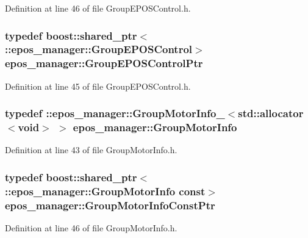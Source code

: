 \-Definition at line 46 of file \-Group\-E\-P\-O\-S\-Control.\-h.

\subsubsection[{\-Group\-E\-P\-O\-S\-Control\-Ptr}]{\setlength{\rightskip}{0pt plus 5cm}typedef boost\-::shared\-\_\-ptr$<$ \-::{\bf epos\-\_\-manager\-::\-Group\-E\-P\-O\-S\-Control}$>$ {\bf epos\-\_\-manager\-::\-Group\-E\-P\-O\-S\-Control\-Ptr}}\label{namespaceepos__manager_a0e2b84afc16c192ac5e704bba6d67ed3}


\-Definition at line 45 of file \-Group\-E\-P\-O\-S\-Control.\-h.

\subsubsection[{\-Group\-Motor\-Info}]{\setlength{\rightskip}{0pt plus 5cm}typedef \-::{\bf epos\-\_\-manager\-::\-Group\-Motor\-Info\-\_\-}$<$std\-::allocator$<$void$>$ $>$ {\bf epos\-\_\-manager\-::\-Group\-Motor\-Info}}\label{namespaceepos__manager_a8ed3cb989d2e60238f124b514aeb2839}


\-Definition at line 43 of file \-Group\-Motor\-Info.\-h.

\subsubsection[{\-Group\-Motor\-Info\-Const\-Ptr}]{\setlength{\rightskip}{0pt plus 5cm}typedef boost\-::shared\-\_\-ptr$<$ \-::{\bf epos\-\_\-manager\-::\-Group\-Motor\-Info} const$>$ {\bf epos\-\_\-manager\-::\-Group\-Motor\-Info\-Const\-Ptr}}\label{namespaceepos__manager_a948f00eed93a79b5074f3a9a7a7aa343}


\-Definition at line 46 of file \-Group\-Motor\-Info.\-h.

